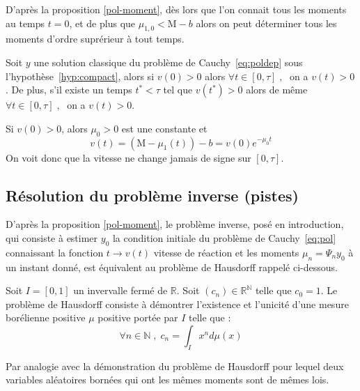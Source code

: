 \documentclass[a4paper]{article}
\newcommand{\mass}{\mathrm{M}}
\newcommand{\dep}{b}
\begin{document}
D'après la proposition \ref{pol-moment}, 
dès lors que l'on connait tous les moments au temps $t=0$, 
et de plus que $\mu_{1,0}<\mass-\dep$
alors on peut déterminer tous les moments d'ordre suprérieur à tout temps.

\begin{proposition}
	\label{prop:vp}
	Soit $y$ une solution classique du problème de Cauchy~\eqref{eq:poldep} sous l'hypothèse~\eqref{hyp:compact}, alors si $v(0) >0 $ alors $\forall t \in [0,\tau] \;, \;$ on a $v(t) >0$ . De plus, s'il existe un temps $t^*<\tau$ tel que $v(t^*) >0$ alors de même $\forall t \in [0,\tau] \;, \;$ on a $v(t) >0$.
\end{proposition}

\begin{preuve}
	Si $v(0)>0$, alors $\mu_0>0$ est une constante et 
	\[ v(t) = ( \mass - \mu_1 (t)) - \dep = v(0)e^{- \mu_0 t} \]
	On voit donc que la vitesse ne change jamais de signe sur $[0,\tau]$.
\end{preuve}


\subsection{Résolution du problème inverse (pistes)}

D'après la proposition \ref{pol-moment}, le problème inverse, posé en introduction, qui consiste à estimer $y_0$ la condition initiale du problème de Cauchy~\eqref{eq:pol} connaissant la fonction  $t \to v(t)$ vitesse de réaction et les moments $\mu_n= \Psi_ny_0$ à un instant donné, est équivalent au problème de Hausdorff rappelé ci-dessous.

\begin{definition}
	Soit $I=[0,1]$ un invervalle fermé de $\mathbb{R}$. Soit $(c_n)\in\mathbb{R}^{\mathbb{N}}$ telle que $c_0=1$.
	Le problème de Hausdorff consiste à démontrer l'existence et l'unicité d'une mesure borélienne positive $\mu$ positive portée par $I$ telle que :
	\[ \forall n \in \mathbb{N} \; ,\; c_n =\int_I x^n d\mu(x) \]
\end{definition}

Par analogie avec la démonstration du problème de Hausdorff pour lequel deux variables aléatoires bornées qui ont les mêmes moments sont de mêmes lois.
\end{document}
